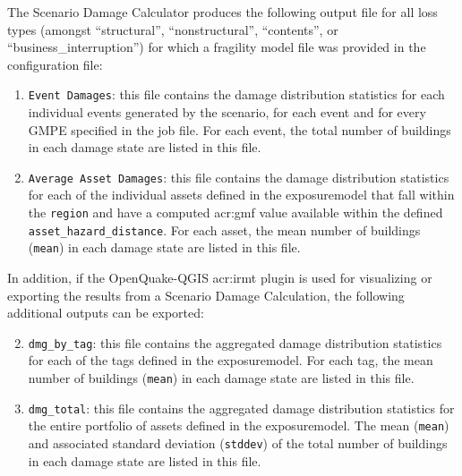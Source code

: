 The Scenario Damage Calculator produces the following output file for
all loss types (amongst ``structural'', ``nonstructural'', ``contents'', or
``business\_interruption'') for which a fragility model file was provided in
the configuration file:

\begin{enumerate}

  \item \Verb+Event Damages+: this file contains the damage distribution
    statistics for each individual \glspl{event} generated by the scenario, 
    for each \gls{event} and for every GMPE specified in the job file. For each
    event, the total number of buildings in each damage state are listed in 
    this file.

  \item \Verb+Average Asset Damages+: this file contains the damage distribution
    statistics for each of the individual \glspl{asset} defined in the
    \gls{exposuremodel} that fall within the \Verb+region+ and have
    a computed \gls{acr:gmf} value available within the defined
    \Verb+asset_hazard_distance+. For each \gls{asset}, the mean number of
    buildings (\Verb+mean+) in each damage state are listed in this file.

\end{enumerate}

In addition, if the OpenQuake-QGIS \gls{acr:irmt} plugin is used for
visualizing or exporting the results from a Scenario Damage Calculation, the
following additional outputs can be exported:

\begin{enumerate}
\setcounter{enumi}{1}

  \item \Verb+dmg_by_tag+: this file contains the aggregated damage
    distribution statistics for each of the \glspl{tag} defined in the
    \gls{exposuremodel}. For each \gls{tag}, the mean number of
    buildings (\Verb+mean+) in each damage state are listed in this file.

  \item \Verb+dmg_total+: this file contains the aggregated damage
    distribution statistics for the entire portfolio of \glspl{asset} defined
    in the \gls{exposuremodel}. The mean (\Verb+mean+) and associated standard
    deviation (\Verb+stddev+) of the total number of buildings in each
    damage state are listed in this file.

\end{enumerate}

